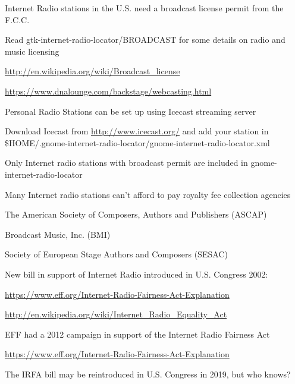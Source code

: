 \documentclass[20pt,landscape]{foils}
\begin{document}
\begin{list1}
  \item Internet Radio stations in the U.S. need a broadcast license permit from the F.C.C.
    \begin{list2}
    \item Read gtk-internet-radio-locator/BROADCAST for some details on radio and music licensing
    \item \url{http://en.wikipedia.org/wiki/Broadcast_license}
    \item \url{https://www.dnalounge.com/backstage/webcasting.html}
    \end{list2}
  \item Personal Radio Stations can be set up using Icecast streaming server
    \begin{list2}
    \item Download Icecast from \url{http://www.icecast.org/} and add your station in \$HOME/.gnome-internet-radio-locator/gnome-internet-radio-locator.xml
    \end{list2}
  \item Only Internet radio stations with broadcast permit are included in gnome-internet-radio-locator
\end{list1}


\begin{list1}
\item Many Internet radio stations can't afford to pay royalty fee collection agencies
  \begin{list2}
  \item The American Society of Composers, Authors and Publishers (ASCAP)
  \item Broadcast Music, Inc. (BMI)
    \item Society of European Stage Authors and Composers (SESAC)
  \end{list2}
  \item New bill in support of Internet Radio introduced in U.S. Congress 2002:
  \begin{list2}
  \item \url{https://www.eff.org/Internet-Radio-Fairness-Act-Explanation}
  \item \url{http://en.wikipedia.org/wiki/Internet_Radio_Equality_Act}
  \end{list2}
\item EFF had a 2012 campaign in support of the Internet Radio Fairness Act
  \begin{list2}
  \item \url{https://www.eff.org/Internet-Radio-Fairness-Act-Explanation}
  \end{list2}
\item The IRFA bill may be reintroduced in U.S. Congress in 2019, but who knows?
\end{list1}
\end{document}
